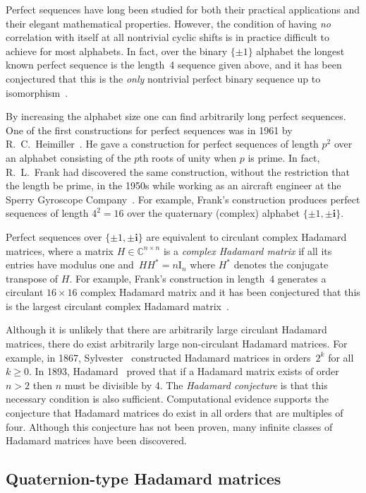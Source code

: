 \documentclass[12pt]{article}
\numberwithin{equation}{section}
\newcommand{\qi}{\mathbf{i}}
\newcommand{\complex}{{\mathbb C}}
\newcommand{\id}{{\mathrm I}}
\begin{document}
Perfect sequences have long been studied for both their practical applications and their elegant mathematical properties.
However, the condition of having \emph{no} correlation with itself at all nontrivial cyclic shifts is in practice
difficult to achieve for most alphabets.  In fact, over the binary $\{\pm1\}$ alphabet the longest known perfect sequence
is the length~4 sequence given above, and
it has been conjectured that this is the \emph{only} nontrivial
perfect binary sequence up to isomorphism~\cite{ryser1963combinatorial}.

By increasing the alphabet size one can find arbitrarily long perfect sequences.  One of the first constructions
for perfect sequences was in 1961 by R.~C.~Heimiller~\cite{Heimiller1961}.  He
gave a construction for perfect sequences of length $p^2$
over an alphabet consisting of the $p$th roots of unity when $p$ is prime. In fact, R.~L.~Frank
had discovered the same construction, without the restriction that the length be prime,
in the 1950s while working as an aircraft engineer at the Sperry
Gyroscope Company~\cite{frank}.
For example, Frank's construction produces perfect sequences
of length $4^2=16$ over the quaternary (complex) alphabet $\{\pm1,\pm\qi\}$.

Perfect sequences over $\{\pm1,\pm\qi\}$ are
equivalent to circulant complex Hadamard matrices, where
a matrix $H\in \complex^{n\times n}$ is a \emph{complex Hadamard matrix}
if all its entries have modulus one and~$HH^*=n\id_n$ where $H^*$ denotes the conjugate transpose of $H$.
For example, Frank's construction in length~4 generates
a circulant $16\times16$ complex Hadamard matrix
and it has been conjectured that this is the largest circulant complex Hadamard matrix~\cite{turyn1970complex}.

Although it is unlikely that there are arbitrarily large circulant Hadamard matrices,
there do exist arbitrarily large non-circulant Hadamard matrices.  For example,
in 1867, Sylvester~\cite{Sylvester1867} constructed Hadamard matrices in orders~$2^k$ for all $k\geq0$.
In 1893, Hadamard~\cite{hadamard1893resolution} proved
that if a Hadamard matrix exists of order $n>2$ then $n$ must be divisible by 4.
The \emph{Hadamard conjecture} is that this necessary condition is also sufficient.
Computational evidence supports the conjecture that Hadamard matrices do exist in all orders that are multiples of four.
Although this conjecture has not been proven, many infinite classes of Hadamard matrices have been discovered.

\subsection{Quaternion-type Hadamard matrices}
\label{sec:qt-intro}
\end{document}
